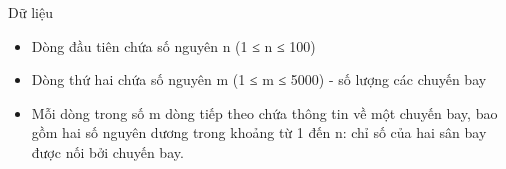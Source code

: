 Dữ liệu
\begin{itemize}
	\item     Dòng đầu tiên chứa số nguyên n (1 ≤ n ≤ 100)   
	\item     Dòng thứ hai chứa số nguyên m (1 ≤ m ≤ 5000) - số lượng các chuyến bay   
	\item     Mỗi dòng trong số m dòng tiếp theo chứa thông tin về một chuyến bay, bao gồm hai số nguyên dương trong khoảng từ 1 đến n: chỉ số của hai sân bay được nối bởi chuyến bay.   
\end{itemize}